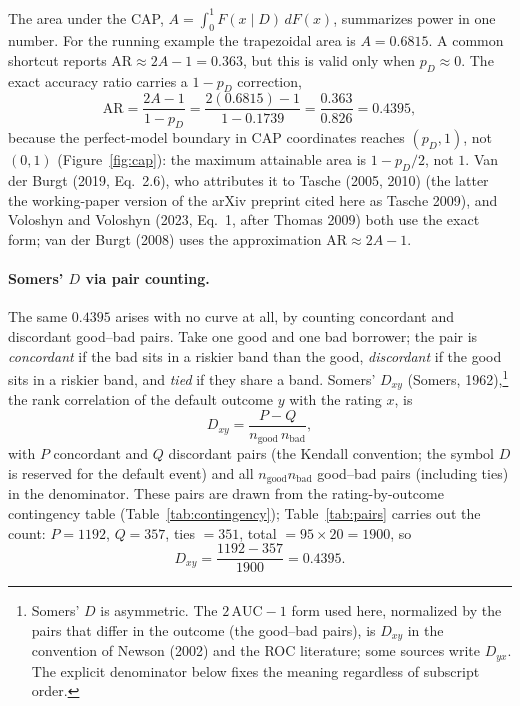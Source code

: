 \documentclass[12pt]{article}
\newcommand{\pD}{p_D}
\newcommand{\AR}{\mathrm{AR}}
\begin{document}
The area under the CAP, $A=\int_0^1 F(x\mid D)\,dF(x)$, summarizes power in one number. For
the running example the trapezoidal area is $A=0.6815$. A common shortcut reports
$\AR\approx 2A-1=0.363$, but this is valid only when $\pD\approx 0$. The exact accuracy ratio
carries a $1-\pD$ correction,
\begin{equation}\label{eq:ar-exact}
\AR=\frac{2A-1}{1-\pD}=\frac{2(0.6815)-1}{1-0.1739}=\frac{0.363}{0.826}=0.4395,
\end{equation}
because the perfect-model boundary in CAP coordinates reaches $(\pD,1)$, not $(0,1)$
(Figure~\ref{fig:cap}): the maximum attainable area is $1-\pD/2$, not $1$. Van der Burgt
(2019, Eq.~2.6), who attributes it to Tasche (2005, 2010) (the latter the working-paper
version of the arXiv preprint cited here as Tasche 2009), and Voloshyn and Voloshyn
(2023, Eq.~1, after Thomas 2009) both use the exact
form; van der Burgt (2008) uses the approximation $\AR\approx 2A-1$.

\paragraph{Somers' $D$ via pair counting.} The same $0.4395$ arises with no curve at all, by
counting concordant and discordant good--bad pairs. Take one good and one bad borrower; the
pair is \emph{concordant} if the bad sits in a riskier band than the good, \emph{discordant}
if the good sits in a riskier band, and \emph{tied} if they share a band. Somers'
$D_{xy}$ (Somers, 1962),\footnote{Somers' $D$ is asymmetric. The $2\,\mathrm{AUC}-1$ form used here, normalized by the pairs that differ in the outcome (the good--bad pairs), is $D_{xy}$ in the convention of Newson (2002) and the ROC literature; some sources write $D_{yx}$. The explicit denominator below fixes the meaning regardless of subscript order.} the rank correlation of the default outcome $y$ with the rating $x$, is
\begin{equation}\label{eq:somers}
D_{xy}=\frac{P-Q}{n_{\text{good}}\,n_{\text{bad}}},
\end{equation}
with $P$ concordant and $Q$ discordant pairs (the Kendall convention; the symbol $D$ is reserved
for the default event) and all $n_{\text{good}}n_{\text{bad}}$ good--bad pairs (including ties) in
the denominator. These pairs are drawn from the rating-by-outcome contingency table
(Table~\ref{tab:contingency}); Table~\ref{tab:pairs} carries out the count:
$P=1192$, $Q=357$, ties $=351$, total $=95\times20=1900$, so
\begin{equation}
D_{xy}=\frac{1192-357}{1900}=0.4395 .
\end{equation}
\end{document}
